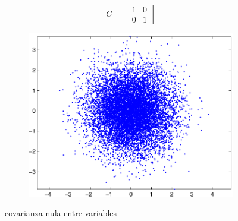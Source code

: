 \documentclass[11pt]{scrartcl}
\begin{document}
\begin{figure}[h!]
 \centering
 \begin{subfigure}{0.49\textwidth}
$$
C = \begin{bmatrix}
1    & 0 \\
0    & 1   
\end{bmatrix}
$$ 
\end{subfigure}
 \begin{subfigure}{0.39\textwidth}
    \includegraphics[width=\textwidth]{img/matriz_covarianza_0}
 \end{subfigure}
 \caption{covarianza nula entre variables}
\end{figure}
\end{document}
